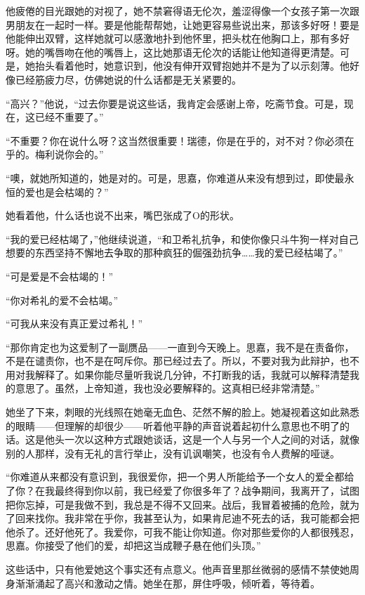 \par 他疲倦的目光跟她的对视了，她不禁窘得语无伦次，羞涩得像一个女孩子第一次跟男朋友在一起时一样。要是他能帮帮她，让她更容易些说出来，那该多好呀！要是他能伸出双臂，这样她就可以感激地扑到他怀里，把头枕在他胸口上，那有多好呀。她的嘴唇吻在他的嘴唇上，这比她那语无伦次的话能让他知道得更清楚。可是，她抬头看着他时，她意识到，他没有伸开双臂抱她并不是为了以示刻薄。他好像已经筋疲力尽，仿佛她说的什么话都是无关紧要的。
\par “高兴？”他说，“过去你要是说这些话，我肯定会感谢上帝，吃斋节食。可是，现在，这已经不重要了。”
\par “不重要？你在说什么呀？这当然很重要！瑞德，你是在乎的，对不对？你必须在乎的。梅利说你会的。”
\par “噢，就她所知道的，她是对的。可是，思嘉，你难道从来没有想到过，即使最永恒的爱也是会枯竭的？”
\par 她看着他，什么话也说不出来，嘴巴张成了O的形状。
\par “我的爱已经枯竭了，”他继续说道，“和卫希礼抗争，和使你像只斗牛狗一样对自己想要的东西坚持不懈地去争取的那种疯狂的倔强劲抗争……我的爱已经枯竭了。”
\par “可是爱是不会枯竭的！”
\par “你对希礼的爱不会枯竭。”
\par “可我从来没有真正爱过希礼！”
\par “那你肯定也为这爱制了一副赝品——一直到今天晚上。思嘉，我不是在责备你，不是在谴责你，也不是在呵斥你。那已经过去了。所以，不要对我为此辩护，也不用对我解释了。如果你能尽量听我说几分钟，不打断我的话，我就可以解释清楚我的意思了。虽然，上帝知道，我也没必要解释的。这真相已经非常清楚。”
\par 她坐了下来，刺眼的光线照在她毫无血色、茫然不解的脸上。她凝视着这如此熟悉的眼睛——但理解的却很少——听着他平静的声音说着起初什么意思也不明了的话。这是他头一次以这种方式跟她谈话，这是一个人与另一个人之间的对话，就像别的人那样，没有无礼的言行举止，没有讥讽嘲笑，也没有令人费解的哑谜。
\par “你难道从来都没有意识到，我很爱你，把一个男人所能给予一个女人的爱全都给了你？在我最终得到你以前，我已经爱了你很多年了？战争期间，我离开了，试图把你忘掉，可是我做不到，我总是不得不又回来。战后，我冒着被捕的危险，就为了回来找你。我非常在乎你，我甚至认为，如果肯尼迪不死去的话，我可能都会把他杀了。还好他死了。我爱你，可我不能让你知道。你对那些爱你的人都很残忍，思嘉。你接受了他们的爱，却把这当成鞭子悬在他们头顶。”
\par 这些话中，只有他爱她这个事实还有点意义。他声音里那丝微弱的感情不禁使她周身渐渐涌起了高兴和激动之情。她坐在那，屏住呼吸，倾听着，等待着。
